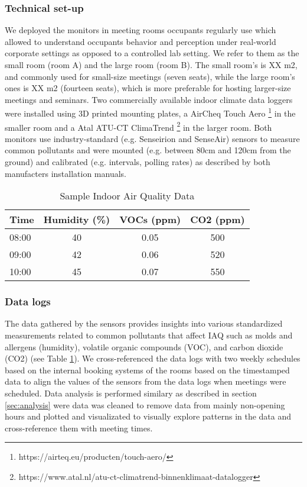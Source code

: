 \subsubsection{Technical set-up}

We deployed the monitors in meeting rooms occupants regularly use which allowed to understand occupants behavior and perception under real-world corporate settings as opposed to a controlled lab setting. We refer to them as the small room (room A) and the large room (room B). The small room’s is XX m2, and commonly used for small-size meetings (seven seats), while the large room’s ones is XX m2 (fourteen seats), which is more preferable for hosting larger-size meetings and seminars. Two commercially available indoor climate data loggers were installed using 3D printed mounting plates, a AirCheq Touch Aero \footnote{https://airteq.eu/producten/touch-aero/} in the smaller room and a Atal ATU-CT ClimaTrend \footnote{https://www.atal.nl/atu-ct-climatrend-binnenklimaat-datalogger} in the larger room. Both monitors use industry-standard (e.g. Senseirion and SenseAir) sensors to measure common pollutants and were mounted (e.g. between 80cm and 120cm from the ground) and calibrated (e.g. intervals, polling rates) as described by both manufacters installation manuals.

\begin{table}[htbp]
    \centering
    \caption{Sample Indoor Air Quality Data}
    \begin{tabular}{lccc}
        \toprule
        \textbf{Time} & \textbf{Humidity (\%)} & \textbf{VOCs (ppm)} & \textbf{CO2 (ppm)} \\
        \midrule
        08:00 & 40 & 0.05 & 500 \\
        09:00 & 42 & 0.06 & 520 \\
        10:00 & 45 & 0.07 & 550 \\
        \bottomrule
    \end{tabular}
    \label{tab:air-quality}
\end{table}

\subsubsection{Data logs}

The data gathered by the sensors provides insights into various standardized measurements related to common pollutants that affect IAQ such as molds and allergens (humidity), volatile organic compounds (VOC), and carbon dioxide (CO2) (see Table \ref{tab:air-quality}). We cross-referenced the data logs with two weekly schedules based on the internal booking systems of the rooms based on the timestamped data to align the values of the sensors from the data logs when meetings were scheduled.
Data analysis is performed similary as described in section \ref{sec:analysis} were data was cleaned to remove data from mainly non-opening hours and plotted and visualizated to visually explore patterns in the data and cross-reference them with meeting times.


